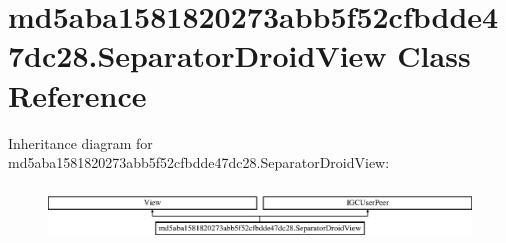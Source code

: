 \hypertarget{classmd5aba1581820273abb5f52cfbdde47dc28_1_1SeparatorDroidView}{}\section{md5aba1581820273abb5f52cfbdde47dc28.\+Separator\+Droid\+View Class Reference}
\label{classmd5aba1581820273abb5f52cfbdde47dc28_1_1SeparatorDroidView}
Inheritance diagram for md5aba1581820273abb5f52cfbdde47dc28.\+Separator\+Droid\+View\+:\begin{figure}[H]
\begin{center}
\leavevmode
\includegraphics[height=1.473684cm]{classmd5aba1581820273abb5f52cfbdde47dc28_1_1SeparatorDroidView}
\end{center}
\end{figure}
